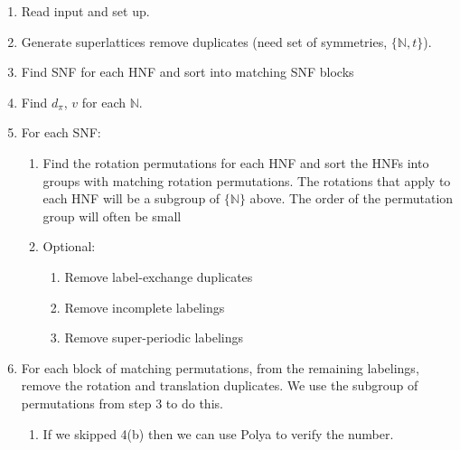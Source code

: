 \documentclass{article}
\begin{document}
\begin{enumerate}
\item Read input and set up.
\item Generate superlattices remove duplicates (need set of symmetries, $\{\mathbb{N},t\}$). 
\item Find SNF for each HNF and sort into matching SNF blocks
\item Find $d_{\pi}$, $v$ for each $\mathbb{N}$.
\item For each SNF:
  \begin{enumerate}
  \item Find the rotation permutations for each HNF and sort the HNFs into groups with matching
    rotation permutations. The rotations that apply to each HNF will be a subgroup of
    $\{\mathbb{N}\}$ above. The order of the permutation group will often be small
  \item Optional:
    \begin{enumerate}
    \item Remove label-exchange duplicates
    \item Remove incomplete labelings
    \item Remove super-periodic labelings
    \end{enumerate}
  \end{enumerate}
\item For each block of matching permutations, from the remaining labelings, remove the rotation and
  translation duplicates. We use the subgroup of permutations from step 3 to do this.
\begin{enumerate}
\item If we skipped 4(b) then we can use Polya to verify the number.
\end{enumerate}

\end{enumerate}
\end{document}
